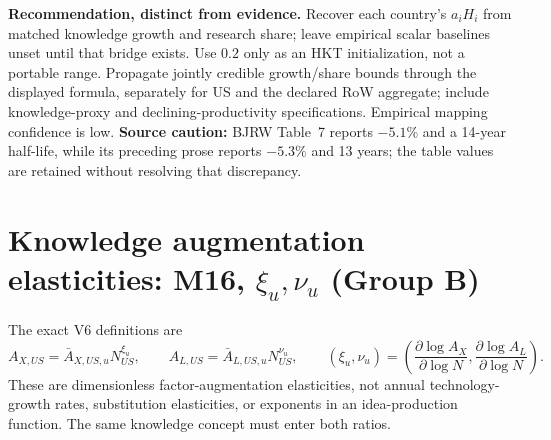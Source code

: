 \documentclass[10pt,a4paper,landscape]{article}
\begin{document}
\noindent\textbf{Recommendation, distinct from evidence.}
Recover each country's $a_iH_i$ from matched knowledge growth and research
share; leave empirical scalar baselines unset until that bridge exists.
Use $0.2$ only as an HKT initialization, not a portable range.
Propagate jointly credible growth/share bounds through the displayed
formula, separately for US and the declared RoW aggregate; include
knowledge-proxy and declining-productivity specifications. Empirical mapping
confidence is low. \textbf{Source caution:} BJRW Table~7 reports $-5.1\%$
and a 14-year half-life, while its preceding prose reports $-5.3\%$ and
13 years; the table values are retained without resolving that discrepancy.

\clearpage
\section[Knowledge augmentation elasticities: M16, xi u,nu u (Group B)]{Knowledge augmentation elasticities: M16, $\xi_u,\nu_u$ (Group B)}

The exact V6 definitions are
\[
 A_{X,US}=\bar A_{X,US,u}N_{US}^{\xi_u},\qquad
 A_{L,US}=\bar A_{L,US,u}N_{US}^{\nu_u},\qquad
 (\xi_u,\nu_u)=
 \left(\frac{\partial\log A_X}{\partial\log N},
       \frac{\partial\log A_L}{\partial\log N}\right).
\]
These are dimensionless factor-augmentation elasticities, not annual
technology-growth rates, substitution elasticities, or exponents in an
idea-production function. The same knowledge concept must enter both ratios.
\end{document}
